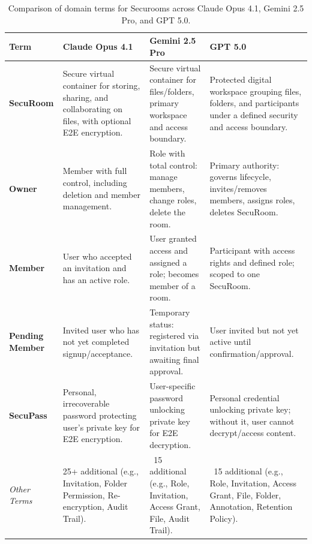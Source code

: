 \begin{table}[htbp]
    \centering
    \begin{tabular}{|p{2.5cm}|p{4cm}|p{4cm}|p{4cm}|}
    \hline
    \rowcolor{gray!20}
    \textbf{Term} & \textbf{Claude Opus 4.1} & \textbf{Gemini 2.5 Pro} & \textbf{GPT 5.0} \\
    \hline
    \textbf{SecuRoom} & 
    Secure virtual container for storing, sharing, and collaborating on files, with optional E2E encryption. &
    Secure virtual container for files/folders, primary workspace and access boundary. &
    Protected digital workspace grouping files, folders, and participants under a defined security and access boundary. \\
    \hline
    \textbf{Owner} & 
    Member with full control, including deletion and member management. &
    Role with total control: manage members, change roles, delete the room. &
    Primary authority: governs lifecycle, invites/removes members, assigns roles, deletes SecuRoom. \\
    \hline
    \textbf{Member} & 
    User who accepted an invitation and has an active role. &
    User granted access and assigned a role; becomes member of a room. &
    Participant with access rights and defined role; scoped to one SecuRoom. \\
    \hline
    \textbf{Pending Member} & 
    Invited user who has not yet completed signup/acceptance. &
    Temporary status: registered via invitation but awaiting final approval. &
    User invited but not yet active until confirmation/approval. \\
    \hline
    \textbf{SecuPass} & 
    Personal, irrecoverable password protecting user's private key for E2E encryption. &
    User-specific password unlocking private key for E2E decryption. &
    Personal credential unlocking private key; without it, user cannot decrypt/access content. \\
    \hline
    \rowcolor{gray!10}
    \textit{Other Terms} & 
    25+ additional (e.g., Invitation, Folder Permission, Re-encryption, Audit Trail). &
    ~15 additional (e.g., Role, Invitation, Access Grant, File, Audit Trail). &
    ~15 additional (e.g., Role, Invitation, Access Grant, File, Folder, Annotation, Retention Policy). \\
    \hline
    \end{tabular}
    \caption{Comparison of domain terms for Securooms across Claude Opus 4.1, Gemini 2.5 Pro, and GPT 5.0.}
    \label{tab:securooms-ubiquitous-language}
\end{table}


